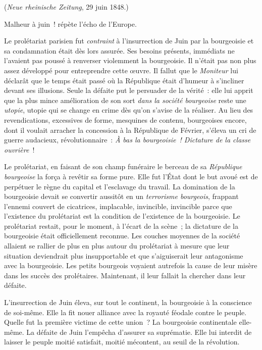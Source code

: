 \documentclass[twoside]{book} %
\begin{document}
{\raggedleft \noindent (\emph{Neue rheinische Zeitung}, 29 juin 1848.)\par}
\noindent Malheur à juin ! répète l’écho de l’Europe.\par
Le prolétariat parisien fut \emph{contraint} à l’insurrection de Juin par la bourgeoisie et sa condamnation était dès lors assurée. Ses besoins présents, immédiats ne l’avaient pas poussé à renverser violemment la bourgeoisie. Il n’était pas non plus assez développé pour entreprendre cette œuvre. Il fallut que le \emph{Moniteur} lui déclarât que le temps était passé où la République était d’humeur à s’incliner devant ses illusions. Seule la défaite put le persuader de la vérité : elle lui apprit que la plus mince amélioration de son sort \emph{dans la société bourgeoise} reste une \emph{utopie}, utopie qui se change en crime dès qu’on s’avise de la réaliser. Au lieu des revendications, excessives de forme, mesquines de contenu, bourgeoises encore, dont il voulait arracher la concession à la République de Février, s’éleva un cri de guerre audacieux, révolutionnaire : \emph{À bas la bourgeoisie ! Dictature de la classe ouvrière} !\par
Le prolétariat, en faisant de son champ funéraire le berceau de sa \emph{République bourgeoise} la força à revêtir sa forme pure. Elle fut l’État dont le but avoué est de perpétuer le règne du capital et l’esclavage du travail. La domination de la bourgeoisie devait se convertir aussitôt en un \emph{terrorisme bourgeois}, frappant l’ennemi couvert de cicatrices, implacable, invincible, invincible parce que l’existence du prolétariat est la condition de l’existence de la bourgeoisie. Le prolétariat restait, pour le moment, à l’écart de la scène ; la dictature de la bourgeoisie était officiellement reconnue. Les couches moyennes de la société allaient se rallier de plus en plus autour du prolétariat à mesure que leur situation deviendrait plus insupportable et que s’aiguiserait leur antagonisme avec la bourgeoisie. Les petits bourgeois voyaient autrefois la cause de leur misère dans les succès des prolétaires. Maintenant, il leur fallait la chercher dans leur défaite.\par
L’insurrection de Juin éleva, sur tout le continent, la bourgeoisie à la conscience de soi-même. Elle la fit nouer alliance avec la royauté féodale contre le peuple. Quelle fut la première victime de cette union ? La bourgeoisie continentale elle-même. La défaite de Juin l’empêcha d’assurer sa suprématie. Elle lui interdit de laisser le peuple moitié satisfait, moitié mécontent, au seuil de la révolution.\par
\end{document}
